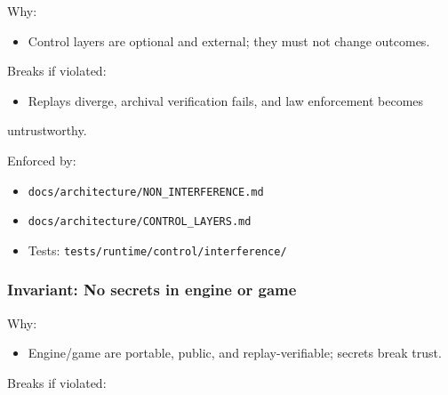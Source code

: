 \documentclass[9pt,a4paper,openany]{book}
\begin{document}
Why:



\begin{itemize}
\item Control layers are optional and external; they must not change outcomes.\allowbreak{}
\end{itemize}


Breaks if violated:



\begin{itemize}
\item Replays diverge, archival verification fails, and law enforcement becomes
\end{itemize}


untrustworthy.\allowbreak{}



Enforced by:



\begin{itemize}
\item \texttt{docs/\allowbreak{}architecture/\allowbreak{}NON\_\allowbreak{}INTERFERENCE.\allowbreak{}md}
\end{itemize}


\begin{itemize}
\item \texttt{docs/\allowbreak{}architecture/\allowbreak{}CONTROL\_\allowbreak{}LAYERS.\allowbreak{}md}
\end{itemize}


\begin{itemize}
\item Tests: \texttt{tests/\allowbreak{}runtime/\allowbreak{}control/\allowbreak{}interference/\allowbreak{}}
\end{itemize}





\subsubsection{Invariant: No secrets in engine or game}


Why:



\begin{itemize}
\item Engine/\allowbreak{}game are portable, public, and replay-\allowbreak{}verifiable; secrets break trust.\allowbreak{}
\end{itemize}


Breaks if violated:
\end{document}
